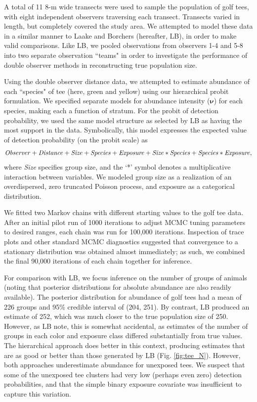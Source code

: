 \documentclass[10pt]{article}
\begin{document}
A total of 11 8-m wide transects were used to sample the population of golf tees, with eight independent observers traversing each transect.  Transects varied in length, but completely covered the study area.  We attempted to model these data in a similar manner to Laake and Borchers \cite{LaakeBorchers2004} (hereafter, LB), in order to make valid comparisons.  Like LB, we pooled observations from observers 1-4 and 5-8 into two separate observation ``teams" in order to investigate the performance of double observer methods in reconstructing true population size.

Using the double observer distance data, we attempted to estimate abundance of each ``species" of tee (here, green and yellow) using our hierarchical probit formulation.  We specified separate models for abundance intensity ($\boldsymbol{\nu}$) for each species, making each a function of stratum. For the probit of detection probability, we used the same model structure as selected by LB as having the most support in the data.  Symbolically, this model expresses the expected value of detection probability (on the probit scale) as
$$
{\it Observer+Distance+Size+Species+Exposure+Size*Species+Species*Exposure},
$$
where {\it Size} specifies group size, and the `*' symbol denotes a multiplicative interaction between variables.  We modeled group size as a realization of an overdispersed, zero truncated Poisson process, and exposure as a categorical distribution.

We fitted two Markov chains with different starting values to the golf tee data.  After an initial pilot run of 1000 iterations to adjust MCMC tuning parameters to desired ranges, each chain was run for 100,000 iterations.  Inspection of trace plots and other standard MCMC diagnostics suggested that convergence to a stationary distribution was obtained almost immediately; as such, we combined the final 90,000 iterations of each chain together for inference.

For comparison with LB, we focus inference on the number of groups of animals (noting that posterior distributions for absolute abundance are also readily available).  The posterior distribution for abundance of golf tees had a mean of 226 groups and 95\% credible interval of (204, 251).  By contrast, LB produced an estimate of 252, which was much closer to the true population size of 250.  However, as LB note, this is somewhat accidental, as estimates of the number of groups in each
color and exposure class differed substantially from true values.  The hierarchical approach does better in this context, producing estimates that are as good or better than those generated by LB (Fig. \ref{fig:tee_N}).  However, both approaches underestimate abundance for unexposed tees.  We suspect that some of the unexposed tee clusters had very low (perhaps even zero) detection probabilities, and that the simple binary exposure covariate was insufficient to capture this variation.
\end{document}
